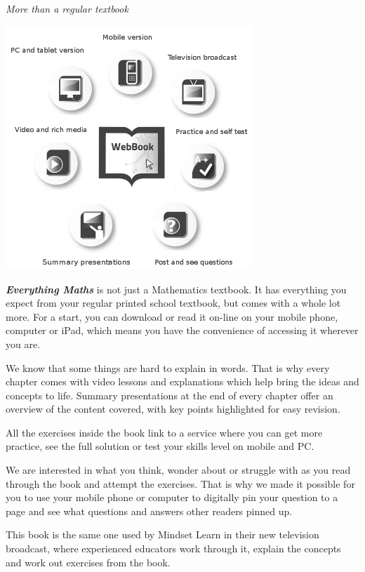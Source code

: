 
\newpage
\thispagestyle{empty}

{\normalfont\sffamily\fontsize{22}\normalfont\itshape More than a regular textbook} \par

\begin{center}
\includegraphics[width=0.70\textwidth]{title_images/morethantextbook.png}
\end{center}

\par
{
\textbf{\textit{Everything Maths}} is not just a Mathematics textbook. It has everything you expect from
your regular printed school textbook, but comes with a whole lot more. For a start, you can download or read it
on-line on your mobile phone, computer or iPad, which means you have the convenience of accessing
it wherever you are.\par


We know that some things are hard to explain in words. That is why every chapter comes with video
lessons and explanations which help bring the ideas and concepts to life. Summary presentations at
the end of every chapter offer an overview of the content covered, with key points highlighted for easy
revision.\par


All the exercises inside the book link to a service where you can get more practice, see the full solution
or test your skills level on mobile and PC.\par


We are interested in what you think, wonder about or struggle with as you read through the book and
attempt the exercises. That is why we made it possible for you to use your mobile phone or computer to
digitally pin your question to a page and see what questions and answers other readers pinned up.\par


This book is the same one used by Mindset Learn in their new television broadcast, where experienced educators work through it, explain the concepts and work out exercises from the book.
}




